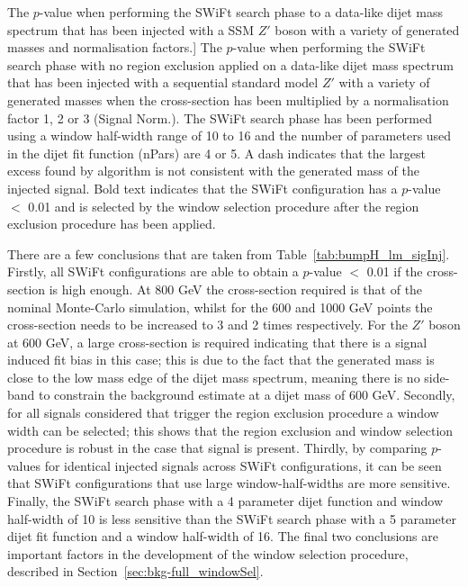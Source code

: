 \begin{table}[!ht]
\caption
    [The  \bh{} \mbox{$p$-value} when performing the SWiFt search phase to
      a data-like dijet mass spectrum that has been injected with a SSM $Z'$ boson with
      a variety of generated masses and normalisation factors.]
    {\label{tab:bumpH_lm_sigInj}
      The  \bh{} \mbox{$p$-value} when performing the SWiFt search phase with no region exclusion applied
      on a data-like dijet mass spectrum that has been injected with a sequential standard model $Z'$ with
      a variety of generated masses when the cross-section has been multiplied by a normalisation factor 1, 2 or 3 (Signal Norm.).
      The SWiFt search phase has been performed using a window half-width range of 10 to 16
      and the number of parameters used in the dijet fit function (nPars) are 4 or 5.
      A dash indicates that the largest excess found by \bh{} algorithm is not consistent with the generated mass of the injected signal.
      Bold text indicates that the SWiFt configuration has a \bh{} $p$-value $<$ 0.01
      and is selected by the window selection procedure after the region exclusion procedure has been applied. }
\end{table}

There are a few conclusions that are taken from Table~\ref{tab:bumpH_lm_sigInj}.
Firstly, all SWiFt configurations are able to obtain a \bh{} $p$-value $<$ 0.01 if the cross-section is high enough.
At 800 GeV the cross-section required is that of the nominal Monte-Carlo simulation, whilst for the 600 and 1000 GeV points
the cross-section needs to be increased to 3 and 2 times respectively.
For the $Z'$ boson at 600 GeV, a large cross-section is required indicating that
there is a signal induced fit bias in this case;
this is due to the fact that the generated mass is close to the low mass edge of the 
dijet mass spectrum, meaning there is no side-band to constrain the background estimate at a dijet mass of 600 GeV.
Secondly, for all signals considered that trigger the region exclusion procedure a window width can be selected;
this shows that the region exclusion and window selection procedure is robust in the case that signal is present.
Thirdly, by comparing \bh{} $p$-values for identical injected signals across SWiFt configurations,
it can be seen that SWiFt configurations that use large window-half-widths are more sensitive.
Finally,
the SWiFt search phase with a 4 parameter dijet function and window half-width of 10 is less sensitive than the
SWiFt search phase with a 5 parameter dijet fit function and a window half-width of 16.
The final two conclusions are important factors in the development of the window selection procedure, described in Section~\ref{sec:bkg-full_windowSel}.

